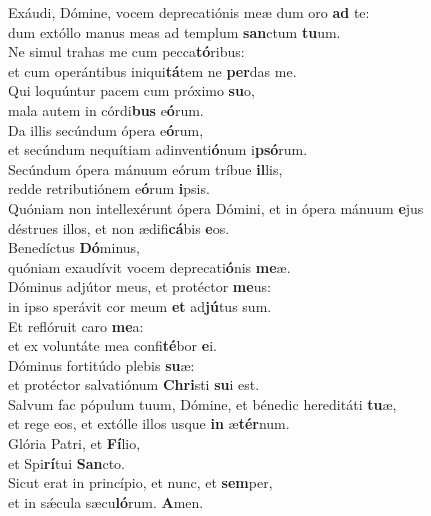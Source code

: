 \evenverse Exáudi, Dómine, vocem deprecatiónis meæ dum oro \textbf{ad} te:~\*\\
\evenverse dum extóllo manus meas ad templum \textbf{san}ctum \textbf{tu}um.\\
\oddverse Ne simul trahas me cum pecca\textbf{tó}ribus:~\*\\
\oddverse et cum operántibus iniqui\textbf{tá}tem ne \textbf{per}das me.\\
\evenverse Qui loquúntur pacem cum próximo \textbf{su}o,~\*\\
\evenverse mala autem in córdi\textbf{bus} e\textbf{ó}rum.\\
\oddverse Da illis secúndum ópera e\textbf{ó}rum,~\*\\
\oddverse et secúndum nequítiam adinventi\textbf{ó}num i\textbf{psó}rum.\\
\evenverse Secúndum ópera mánuum eórum tríbue \textbf{il}lis,~\*\\
\evenverse redde retributiónem e\textbf{ó}rum \textbf{i}psis.\\
\oddverse Quóniam non intellexérunt ópera Dómini, et in ópera mánuum \textbf{e}jus~\*\\
\oddverse déstrues illos, et non ædifi\textbf{cá}bis \textbf{e}os.\\
\evenverse Benedíctus \textbf{Dó}minus,~\*\\
\evenverse quóniam exaudívit vocem deprecati\textbf{ó}nis \textbf{me}æ.\\
\oddverse Dóminus adjútor meus, et protéctor \textbf{me}us:~\*\\
\oddverse in ipso sperávit cor meum \textbf{et} ad\textbf{jú}tus sum.\\
\evenverse Et reflóruit caro \textbf{me}a:~\*\\
\evenverse et ex voluntáte mea confi\textbf{té}bor \textbf{e}i.\\
\oddverse Dóminus fortitúdo plebis \textbf{su}æ:~\*\\
\oddverse et protéctor salvatiónum \textbf{Chri}sti \textbf{su}i est.\\
\evenverse Salvum fac pópulum tuum, Dómine, et bénedic hereditáti \textbf{tu}æ,~\*\\
\evenverse et rege eos, et extólle illos usque \textbf{in} æ\textbf{tér}num.\\
\oddverse Glória Patri, et \textbf{Fí}lio,~\*\\
\oddverse et Spi\textbf{rí}tui \textbf{San}cto.\\
\evenverse Sicut erat in princípio, et nunc, et \textbf{sem}per,~\*\\
\evenverse et in sǽcula sæcu\textbf{ló}rum. \textbf{A}men.\\
